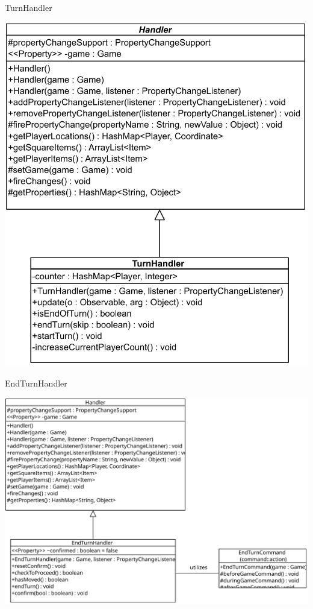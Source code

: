 \documentclass[11pt,t]{beamer}
\begin{document}
\begin{frame}{TurnHandler}
\begin{center}
\includegraphics[scale=0.45]{images/turnhandler}
\end{center}
\end{frame}

\begin{frame}{EndTurnHandler}
\begin{center}
\includegraphics[scale=0.45]{images/endturnhandler}
\end{center}
\end{frame}
\end{document}
